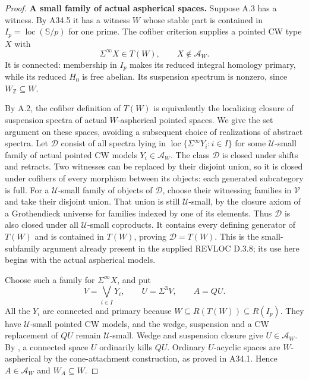 \begin{proof}
\par\medskip\noindent\textbf{A small family of actual aspherical spaces.}\quad
Suppose A.3 has a witness.  By A34.5 it has a witness $W$ whose
stable part is contained in $I_p=\operatorname{loc}(\mathbb S/p)$
for one prime.  The cofiber criterion supplies a pointed CW type
$X$ with
\[
 \Sigma^\infty X\in T(W),\qquad X\notin\mathcal A_W.
 \tag{A34.6.5}
\]
It is connected: membership in $I_p$ makes its reduced integral
homology primary, while its reduced $H_0$ is free abelian.
Its suspension spectrum is nonzero, since $W_{\mathbb Z}\subseteq W$.

By A.2, the cofiber definition of $T(W)$ is equivalently the
localizing closure of suspension spectra of actual $W$-aspherical
pointed spaces.  We give the set argument on these spaces, avoiding
a subsequent choice of realizations of abstract spectra.  Let $\mathcal D$ consist
of all spectra lying in
$\operatorname{loc}\{\Sigma^\infty Y_i:i\in I\}$ for some
$\mathcal U$-small family of actual pointed CW models
$Y_i\in\mathcal A_W$.
The class $\mathcal D$ is closed under shifts and retracts.
Two witnesses can be replaced by their disjoint union, so it is
closed under cofibers of every morphism between its objects:
each generated subcategory is full.  For a $\mathcal U$-small
family of objects of $\mathcal D$, choose their witnessing families
in $\mathcal V$ and take their disjoint union.  That union is still
$\mathcal U$-small, by the closure axiom of a Grothendieck universe
for families indexed by one of its elements.  Thus $\mathcal D$
is also closed under all $\mathcal U$-small coproducts.
It contains every defining generator of $T(W)$ and is contained
in $T(W)$, proving $\mathcal D=T(W)$.
This is the small-subfamily argument already present in the supplied
REVLOC D.3.8; its use here begins with the actual aspherical models.

Choose such a family for $\Sigma^\infty X$, and put
\[
 V=\bigvee_{i\in I}Y_i,
 \qquad U=\Sigma^3V,
 \qquad A=QU.
 \tag{A34.6.6}
\]
All the $Y_i$ are connected and primary because
$W\subseteq R(T(W))\subseteq R(I_p)$.
They have $\mathcal U$-small pointed CW models, and the wedge,
suspension and a CW replacement of $QU$ remain $\mathcal U$-small.
Wedge and suspension closure give $U\in\mathcal A_W$.
By \citet[Proposition~3.1]{ABousfield1996}, a connected space $U$
ordinarily kills $QU$.  Ordinary $U$-acyclic spaces are
$W$-aspherical by the cone-attachment construction, as proved in
A34.1.  Hence $A\in\mathcal A_W$ and $W_A\subseteq W$.


\end{proof}
